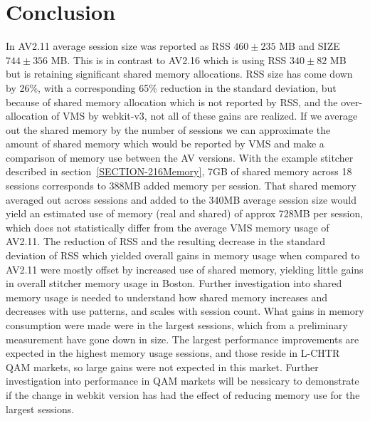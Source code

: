 \documentclass{article}
\begin{document}
\section{Conclusion}
\label{SECTION-Conclusion}

In AV2.11 average session size was reported as RSS $460 \pm 235$ MB and SIZE $744 \pm 356$ MB. This is in contrast to AV2.16 which is using RSS $340 \pm 82$ MB but is retaining significant shared memory allocations. RSS size has come down by 26\%, with a corresponding 65\% reduction in the standard deviation, but because of shared memory allocation which is not reported by RSS, and the over-allocation of VMS by webkit-v3, not all of these gains are realized. If we average out the shared memory by the number of sessions we can approximate the amount of shared memory which would be reported by VMS and make a comparison of memory use between the AV versions. With the example stitcher described in section~\ref{SECTION-216Memory}, 7GB of shared memory across 18 sessions corresponds to 388MB added memory per session. That shared memory averaged out across sessions and added to the 340MB average session size would yield an estimated use of memory (real and shared) of approx 728MB per session, which does not statistically differ from the average VMS memory usage of AV2.11. The reduction of RSS and the resulting decrease in the standard deviation of RSS which yielded overall gains in memory usage when compared to AV2.11 were mostly offset by increased use of shared memory, yielding little gains in overall stitcher memory usage in Boston. Further investigation into shared memory usage is needed to understand how shared memory increases and decreases with use patterns, and scales with session count. What gains in memory consumption were made were in the largest sessions, which from a preliminary measurement have gone down in size. The largest performance improvements are expected in the highest memory usage sessions, and those reside in L-CHTR QAM markets, so large gains were not expected in this market. Further investigation into performance in QAM markets will be nessicary to demonstrate if the change in webkit version has had the effect of reducing memory use for the largest sessions. 
\end{document}
